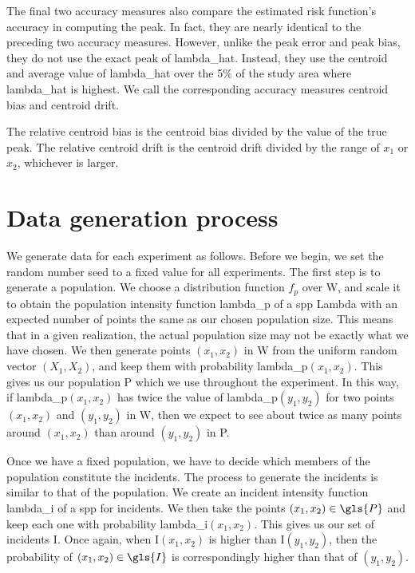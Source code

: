 The final two accuracy measures also compare the estimated risk function's accuracy in computing the peak.
In fact, they are nearly identical to the preceding two accuracy measures.
However, unlike the \gls{peak error} and \gls{peak bias}, they do not use the exact peak of \gls{lambda_hat}.
Instead, they use the centroid and average value of \gls{lambda_hat} over the 5\% of the study area where \gls{lambda_hat} is highest.
We call the corresponding accuracy measures \gls{centroid bias} and \gls{centroid drift}.

The \gls{relative centroid bias} is the \gls{centroid bias} divided by the value of the true peak.
The \gls{relative centroid drift} is the \gls{centroid drift} divided by the range of \(x_1\) or \(x_2\), whichever is larger.

\section{Data generation process}
\label{sec:method:data generation}

We generate data for each experiment as follows.
Before we begin, we set the random number seed to a fixed value for all experiments.
The first step is to generate a population.
We choose a distribution function \(f_p\) over \gls{W}, and scale it to obtain the population intensity function \gls{lambda_p} of a \gls{spp} \gls{Lambda} with an expected number of points the same as our chosen population size.
This means that in a given realization, the actual population size may not be exactly what we have chosen.
We then generate points \((x_1, x_2)\) in \gls{W} from the uniform random vector \((X_1,X_2)\),
and keep them with probability \gls{lambda_p}\((x_1, x_2)\).
This gives us our population \gls{P} which we use throughout the experiment.
In this way,
if \gls{lambda_p}\((x_1, x_2)\) has twice the value of \gls{lambda_p}\((y_1, y_2)\) for two points \((x_1, x_2)\) and \((y_1, y_2)\) in \gls{W},
then we expect to see about twice as many points around \((x_1, x_2)\) than around \((y_1, y_2)\) in \gls{P}.

Once we have a fixed population, we have to decide which members of the population constitute the incidents.
The process to generate the incidents is similar to that of the population.
We create an incident intensity function \gls{lambda_i} of a \gls{spp} for incidents.
We then take the points \((x_1, x_2) \in \gls{P}\) and keep each one with probability \gls{lambda_i}\((x_1, x_2)\).
This gives us our set of incidents \gls{I}.
Once again, when \gls{I}\((x_1, x_2)\) is higher than \gls{I}\((y_1, y_2)\),
then the probability of \((x_1, x_2) \in \gls{I}\) is correspondingly higher than that of \((y_1, y_2)\).

